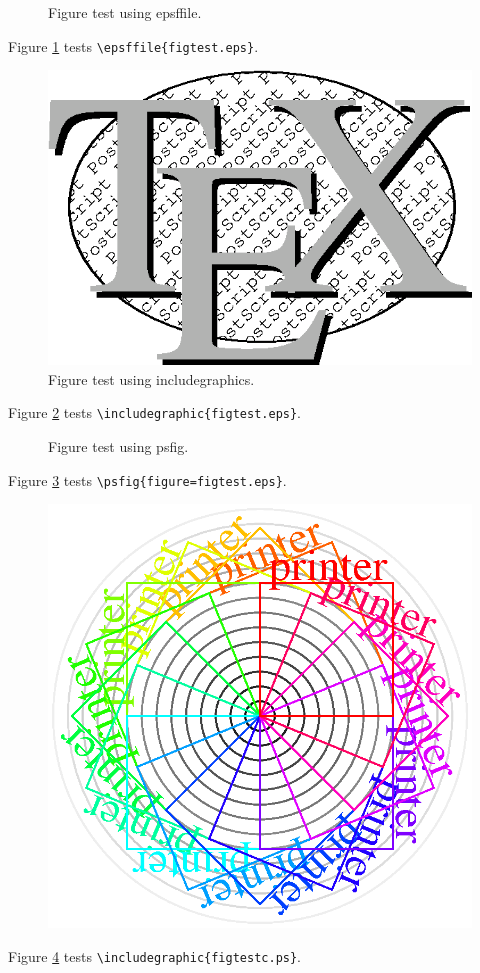 \documentclass{article}
\begin{document}
\begin{figure}
\caption{Figure test using epsffile.} 
\label{figure1}
\end{figure}

Figure \ref{figure1} tests \verb#\epsffile{figtest.eps}#.

\begin{figure}
\includegraphics{figtest.eps}
\caption{Figure test using includegraphics.} 
\label{figure2}
\end{figure}

Figure \ref{figure2} tests \verb#\includegraphic{figtest.eps}#.

\begin{figure}
\caption{Figure test using psfig.} 
\label{figure3}
\end{figure}

Figure \ref{figure3} tests \verb#\psfig{figure=figtest.eps}#.

\begin{figure}
\includegraphics{figtestc.ps}
\label{figure4}
\end{figure}

Figure  \ref{figure4} tests \verb#\includegraphic{figtestc.ps}#.  
\end{document}
